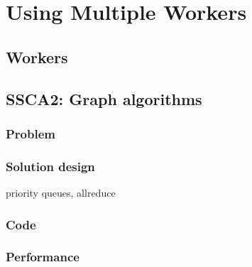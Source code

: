 \chapter{Using Multiple Workers}
\section{Workers}
\section{SSCA2: Graph algorithms}
\subsection{Problem}
\subsection{Solution design} 
priority queues, allreduce 
\subsection{Code} 

\subsection{Performance}


